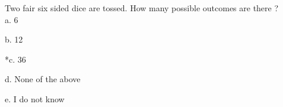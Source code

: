 
Two fair six sided dice are tossed. How many possible outcomes are
there ? \\

a. 6

b. 12

*c. 36

d. None of the above

e. I do not know \\
